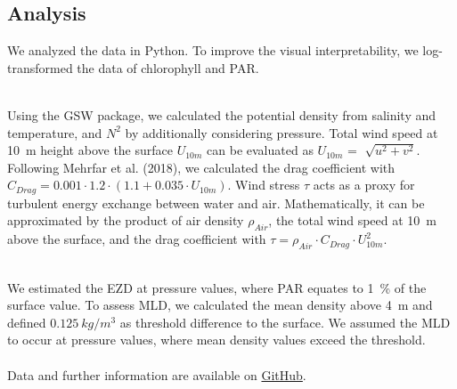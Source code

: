 \documentclass[../Main.tex]{subfiles}
\begin{document}
\subsection*{\crule[blue]{.2cm}{.2cm} Analysis}
We analyzed the data in Python.
To improve the visual interpretability, we log-transformed the data of chlorophyll and PAR.

\\
Using the GSW package, we calculated the potential density from salinity and temperature, and $N^2$ by additionally considering pressure.\supercite{gsw} 
Total wind speed at \SI{10}{m} height above the surface $U_{10m}$ can be evaluated as $U_{10m}$ = $\sqrt[]{u^2 + v^2}$. 
Following Mehrfar et al. (2018), we calculated the drag coefficient with $C_{Drag} = 0.001\cdot1.2\cdot  (1.1+0.035\cdot U_{10m})$. 
Wind stress $\tau$ acts as a proxy for turbulent energy exchange between water and air.
Mathematically, it can be approximated by the product of air density $\rho_{Air}$, the total wind speed at \SI{10}{m} above the surface, and the drag coefficient with $\tau = \rho_{Air}\cdot C_{Drag}\cdot U_{10m}^2$.\supercite{Mehrfar2018}

\\
We estimated the EZD at pressure values, where PAR equates to \SI{1}{\%} of the surface value.\supercite{Lee2007}
To assess MLD, we calculated the mean density above \SI{4}{m} and defined $\SI{0.125}{kg/m^3}$ as threshold difference to the surface. 
We assumed the MLD to occur at pressure values, where mean density values exceed the threshold. 
\\
\\
Data and further information are available on \href{https://github.com/joaldi2208/BloomDynamics}{GitHub}.
\end{document}
